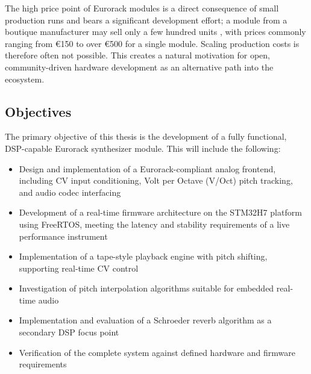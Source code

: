 The high price point of Eurorack modules is a direct consequence of small production 
runs and bears a significant development effort; a module from a boutique manufacturer may 
sell only a few hundred units \cite{douglasAreModularSynths2023}, with prices commonly ranging from €150 to over €500 for a single module.
Scaling production costs is therefore often not possible.
This creates a natural motivation for open, community-driven hardware development as an alternative path into the ecosystem.


\subsection{Objectives}
The primary objective of this thesis is the development of a fully functional, DSP-capable Eurorack synthesizer module. 
This will include the following:

\begin{itemize}
	\item Design and implementation of a Eurorack-compliant analog frontend, including \ac{CV} input conditioning, Volt per Octave (V/Oct) pitch tracking, and audio codec interfacing
	\item Development of a real-time firmware architecture on the STM32H7 platform using FreeRTOS, meeting the latency and stability requirements of a live performance instrument
	\item Implementation of a tape-style playback engine with pitch shifting, supporting real-time CV control
	\item Investigation of pitch interpolation algorithms suitable for embedded real-time audio
	\item Implementation and evaluation of a Schroeder reverb algorithm as a secondary DSP focus point
	\item Verification of the complete system against defined hardware and firmware requirements
\end{itemize}